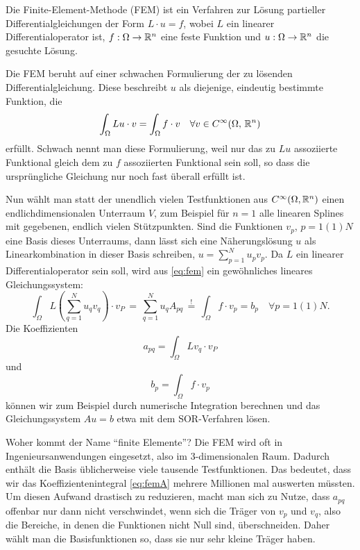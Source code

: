 Die Finite-Element-Methode (FEM) ist ein Verfahren zur Lösung
partieller Differentialgleichungen der Form $L\cdot u = f$, wobei $L$
ein linearer Differentialoperator ist, $f:\Omega\to\mathbb{R}^n$ eine
feste Funktion und $u:\Omega\to\mathbb{R}^n$ die gesuchte Lösung.

Die FEM beruht auf einer schwachen Formulierung der zu lösenden
Differentialgleichung. Diese beschreibt $u$ als diejenige, eindeutig
bestimmte Funktion, die
\begin{equation}
  \label{eq:fem}
  \int_\Omega Lu\cdot v = \int_\Omega f\cdot v\quad\forall v\in
  C^\infty(\Omega,\, \mathbb{R}^n)
\end{equation}
erfüllt. Schwach nennt man diese Formulierung, weil nur das zu $Lu$
assoziierte Funktional gleich dem zu $f$ assoziierten Funktional sein
soll, so dass die ursprüngliche Gleichung nur noch fast überall
erfüllt ist.

Nun wählt man statt der unendlich vielen Testfunktionen
aus $C^\infty(\Omega, \mathbb{R}^n)$ einen endlichdimensionalen Unterraum
$V$, zum Beispiel für $n=1$ alle linearen Splines mit gegebenen,
endlich vielen Stützpunkten. Sind die Funktionen $v_p$, $p=1(1)N$ eine
Basis dieses Unterraums, dann lässt sich eine Näherungslösung $u$ als
Linearkombination in dieser Basis schreiben, $u=\sum_{p=1}^N
u_pv_p$. Da $L$ ein linearer Differentialoperator sein soll, wird aus
\eqref{eq:fem} ein gewöhnliches lineares Gleichungssystem:
\begin{equation}
  \int_\Omega L\left(\sum_{q=1}^N
    u_qv_q\right)\cdot v_P \,=\, \sum_{q=1}^N
  u_q A_{pq} \,\stackrel{!}{=}\,
  \int_\Omega f\cdot v_p = b_p\quad\forall p=1(1)N.
\end{equation}
Die Koeffizienten
\begin{equation}
  \label{eq:femA}
  a_{pq} = \int_\Omega L v_q\cdot v_P
\end{equation}
und
\begin{equation}
  \label{eq:femb}
  b_p = \int_\Omega f\cdot v_p
\end{equation}
können wir zum Beispiel durch numerische Integration berechnen und das
Gleichungssystem $Au=b$ etwa mit dem SOR-Verfahren lösen.

Woher kommt der Name "`finite Elemente"'? Die FEM wird oft in
Ingenieursanwendungen eingesetzt, also im $3$-dimensionalen Raum.
Dadurch enthält die Basis üblicherweise viele tausende
Testfunktionen. Das bedeutet, dass wir das Koeffizientenintegral
\eqref{eq:femA} mehrere Millionen mal auswerten müssten. Um diesen
Aufwand drastisch zu reduzieren, macht man sich zu Nutze, dass
$a_{pq}$ offenbar nur dann nicht verschwindet, wenn sich die Träger
von $v_p$ und $v_q$, also die Bereiche, in denen die Funktionen nicht
Null sind, überschneiden. Daher wählt man die Basisfunktionen so, dass sie
nur sehr kleine Träger haben.

